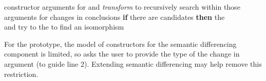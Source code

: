 \begin{algorithm}
\footnotesize
\begin{algorithmic}[1]
    \STATE {} constructor arguments for 
    \STATE {} and \textit{transform} to recursively search within those arguments for changes in conclusions
    \STATE \textbf{if} there are candidates \textbf{then}
    \STATE \hspace*{1em}  the  \\
           \hspace*{1em}  and try to  the  to find an isomorphism
\end{algorithmic}
\end{algorithm}
For the prototype, the model of constructors for the semantic differencing component is limited,
so \sysname asks the user to provide the type of the change in argument (to guide line 2).
Extending semantic differencing may help remove this restriction.




